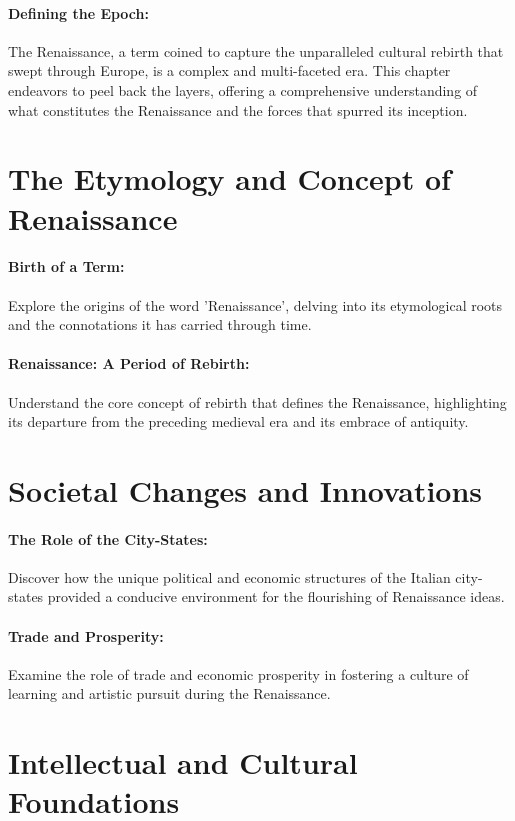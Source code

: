 \documentclass[a4paper,12pt]{book}
\begin{document}
\paragraph{Defining the Epoch:}
The Renaissance, a term coined to capture the unparalleled cultural rebirth that swept through Europe, is a complex and multi-faceted era. This chapter endeavors to peel back the layers, offering a comprehensive understanding of what constitutes the Renaissance and the forces that spurred its inception.

\section*{The Etymology and Concept of Renaissance}

\paragraph{Birth of a Term:}
Explore the origins of the word 'Renaissance', delving into its etymological roots and the connotations it has carried through time.

\paragraph{Renaissance: A Period of Rebirth:}
Understand the core concept of rebirth that defines the Renaissance, highlighting its departure from the preceding medieval era and its embrace of antiquity.

\section*{Societal Changes and Innovations}

\paragraph{The Role of the City-States:}
Discover how the unique political and economic structures of the Italian city-states provided a conducive environment for the flourishing of Renaissance ideas.

\paragraph{Trade and Prosperity:}
Examine the role of trade and economic prosperity in fostering a culture of learning and artistic pursuit during the Renaissance.

\section*{Intellectual and Cultural Foundations}
\end{document}

